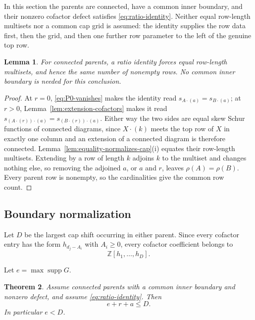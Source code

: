\documentclass[11pt,a4paper]{amsart}
\numberwithin{equation}{section}
\theoremstyle{plain}
\newtheorem{theorem}{Theorem}[section]
\newtheorem{lemma}[theorem]{Lemma}
\theoremstyle{definition}
\DeclareMathOperator{\supp}{supp}
\newcommand{\Z}{\mathbb Z}
\begin{document}
In this section the parents are connected, have a common inner boundary,
and their nonzero cofactor defect satisfies \eqref{eq:ratio-identity}.
Neither equal row-length multisets nor a common cap grid is assumed: the
identity supplies the row data first, then the grid, and then one further
row parameter to the left of the genuine top row.

\begin{lemma}\label{lem:ratio-row-lengths}
For connected parents, a ratio identity forces equal row-length multisets,
and hence the same number of nonempty rows.  No common inner boundary is
needed for this conclusion.
\end{lemma}

\begin{proof}
At \(r=0\), \eqref{eq:P0-vanishes} makes the identity read
\(s_{A\cdot(a)}=s_{B\cdot(a)}\); at \(r>0\), Lemma~\ref{lem:extension-cofactors}
makes it read \(s_{(A\cdot(r))\cdot(a)}=s_{(B\cdot(r))\cdot(a)}\).  Either way the two
sides are equal skew Schur functions of connected diagrams, since \(X\cdot(k)\)
meets the top row of \(X\) in exactly one column and an extension of a connected
diagram is therefore connected.
Lemma~\ref{lem:equality-normalizes-cap}(i) equates their row-length multisets.
Extending by a row of length \(k\) adjoins \(k\) to the multiset and changes
nothing else, so removing the adjoined \(a\), or \(a\) and \(r\), leaves
\(\rho(A)=\rho(B)\).  Every parent row is nonempty, so the cardinalities give
the common row count.
\end{proof}

\subsection{Boundary normalization}\label{subsec:ratio}

Let \(D\) be the largest cap shift occurring in either parent.  Since every cofactor entry has the form \(h_{d_j-A_i}\) with \(A_i\ge0\), every cofactor coefficient belongs to
\begin{equation}\label{eq:bounded-generator}
\Z[h_1,\ldots,h_D].
\end{equation}

Let \(e=\max\supp G\).

\begin{theorem}\label{thm:terminal-gap}
Assume connected parents with a common inner boundary and nonzero defect, and assume \eqref{eq:ratio-identity}.  Then
\[
e+r+a\le D.
\]
In particular \(e<D\).
\end{theorem}
\end{document}
